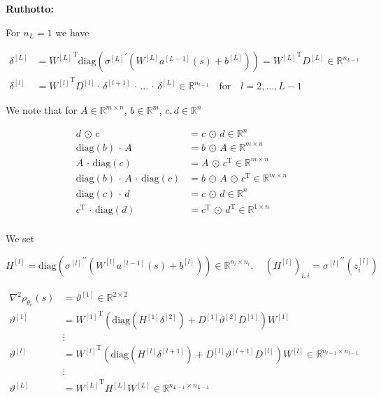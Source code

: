 \textbf{Ruthotto:}

For $n_L = 1$ we have

\begin{align*}
    \delta^{[L]} & = {W^{[L]}}^{\mathrm{T}} \mathrm{diag}({\sigma^{[L]}}^{\prime}(W^{[L]} a^{[L-1]}(s) + b^{[L]})) = {W^{[L]}}^{\mathrm{T}} D^{[L]} \in \mathbb{R}^{n_{L-1}} \\
    \delta^{[l]} & = {W^{[l]}}^{\mathrm{T}} D^{[l]} \cdot \, \delta^{[l+1]} \, \cdot \, \ldots \,  \cdot \, \delta^{[L]} \in \mathbb{R}^{n_{l-1}} \quad \text{for} \quad l = 2, \ldots, L-1
\end{align*}

We note that for $A \in \mathbb{R}^{m \times n}$, $b \in \mathbb{R}^{m}$, $c, d \in \mathbb{R}^{n}$

\begin{align*}
    d \, \odot \, c &= c \, \odot \, d \in \mathbb{R}^{n} \\
    \mathrm{diag}(b) \, \cdot \, A &= b \, \odot \, A \in \mathbb{R}^{m \times n} \\
    A \, \cdot \, \mathrm{diag}(c) &= A \, \odot \, c^{\mathrm{T}} \in \mathbb{R}^{m \times n} \\
    \mathrm{diag}(b) \, \cdot \, A \, \cdot \, \mathrm{diag}(c) &= b \, \odot \, A \, \odot \, c^{\mathrm{T}} \in \mathbb{R}^{m \times n} \\
    \mathrm{diag}(c) \, \cdot \, d &= c \, \odot \, d \in \mathbb{R}^{n} \\
    c^{\mathrm{T}} \, \cdot \, \mathrm{diag}(d) &= c^{\mathrm{T}} \, \odot \, d^{\mathrm{T}} \in \mathbb{R}^{1 \times n} \\
\end{align*}

We set 

\begin{equation*}
    H^{[l]} = \mathrm{diag}({\sigma^{[l]}}^{\prime \prime}(W^{[l]} a^{[l-1]}(s) + b^{[l]})) \in \mathbb{R}^{n_l \times n_l}, \quad (H^{[l]})_{i, i} = {\sigma^{[l]}}^{\prime \prime} (z_{i}^{[l]})
\end{equation*}

\begin{align*}
    \nabla^{2} \rho_{\theta_e}(s) & = \vartheta^{[1]} \in \mathbb{R}^{2 \times 2} \\
    \vartheta^{[1]} & = {W^{[1]}}^{\mathrm{T}} \left( \mathrm{diag}(H^{[1]} \delta^{[2]}) + D^{[1]} \vartheta^{[2]} D^{[1]} \right) W^{[1]} \\
    & \vdots \\
    \vartheta^{[l]} & = {W^{[l]}}^{\mathrm{T}} \left( \mathrm{diag}(H^{[l]} \delta^{[l+1]}) + D^{[l]} \vartheta^{[l+1]} D^{[l]} \right) W^{[l]} \in \mathbb{R}^{n_{l-1} \times n_{l-1}} \\
    & \vdots \\
    \vartheta^{[L]} & = {W^{[L]}}^{\mathrm{T}} H^{[L]} W^{[L]} \in \mathbb{R}^{n_{L-1} \times n_{L-1}}
\end{align*}



